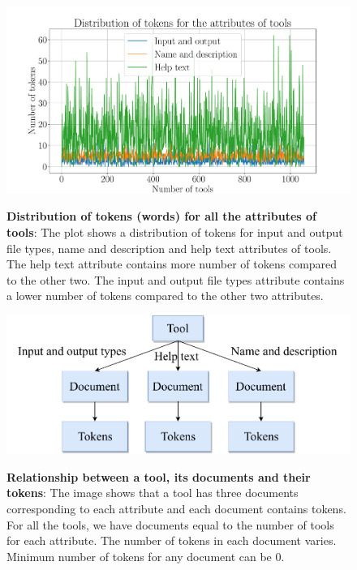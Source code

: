 \begin{figure}[h]
\begin{centering}
    {\includegraphics[scale=0.45]{figures/Tokens_dist.pdf}}
    \caption[Distribution of tokens for all the attributes of tools]{\textbf{Distribution of tokens (words) for all the attributes of tools}: The plot shows a distribution of tokens for input and output file types, name and description and help text attributes of tools. The help text attribute contains more number of tokens compared to the other two. The input and output file types attribute contains a lower number of tokens compared to the other two attributes. }
\end{centering}
\end{figure}

\begin{figure}[h]
\begin{centering}
    {\includegraphics[scale=0.7]{figures/tool-document-tokens.pdf}}
    \caption[Tool, document and tokens]{\textbf{Relationship between a tool, its documents and their tokens}: The image shows that a tool has three documents corresponding to each attribute and each document contains tokens. For all the tools, we have documents equal to the number of tools for each attribute. The number of tokens in each document varies. Minimum number of tokens for any document can be 0.}
\end{centering}
\end{figure}

